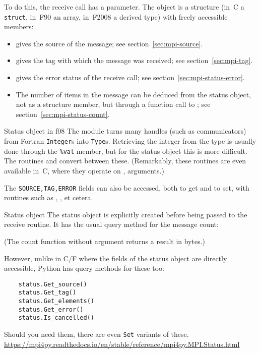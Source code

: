 To do this, the receive call has a  parameter.
The  object
is a structure (in~C a \lstinline{struct}, in~F90 an array, in~F2008 a derived type)
with freely accessible members:
\begin{itemize}
\item {} gives the source of the message;
  see section~\ref{sec:mpi-source}.
\item {} gives the tag with which the message was received;
  see section~\ref{sec:mpi-tag}.
\item {} gives the error status of the receive call;
  see section~\ref{sec:mpi-status-error}.
\item The number of items in the message can be deduced from the status object,
  not as a structure member,
  but through a function call to ;  
  see section~\ref{sec:mpi-status-count}.
\end{itemize}

\begin{fortrannote}{Status object in f08}
  \label{f:status-object}
  The  module turns many handles
  (such as communicators)
  from Fortran \lstinline{Integer}s into \lstinline{Type}s.
  Retrieving the integer from the type is usually done
  through the \lstinline+%val+ member,
  but for the status object this is more difficult.
  The routines  and 
  convert between these.
  (Remarkably, these routines are even available in~C,
  where they operate on ,  arguments.)
\end{fortrannote}

\begin{mpifournote}
  The \lstinline{SOURCE,TAG,ERROR} fields can also be accessed,
  both to get and to set,
  with routines such as
  ,
  ,
  et cetera.
\end{mpifournote}

\begin{pythonnote}{Status object}
  The status object is explicitly created before being passed
  to the receive routine. It has the usual query method
  for the message count:

  (The count function without argument returns a result in bytes.)

  However, unlike in C/F where the fields of the status object
  are directly accessible, Python has query methods for these too:
  \begin{lstlisting}
    status.Get_source()
    status.Get_tag()
    status.Get_elements()
    status.Get_error()
    status.Is_cancelled()
  \end{lstlisting}
  Should you need them, there are even \lstinline{Set}
  variants of these.
  \url{https://mpi4py.readthedocs.io/en/stable/reference/mpi4py.MPI.Status.html}
\end{pythonnote}

